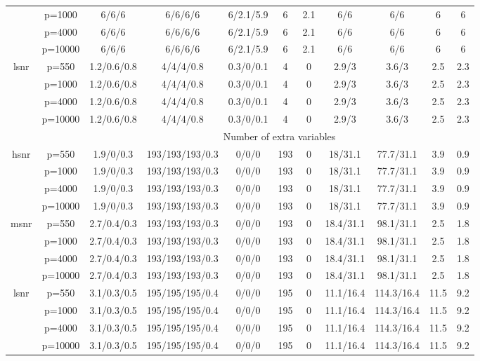 \begin{table}[ht]
{\begin{tabular}{|c|c|ccccccccc|}
   & p=1000 & 6/6/6 & 6/6/6/6 & 6/2.1/5.9 & 6 & 2.1 & 6/6 & 6/6 & 6 & 6 \\ 
   & p=4000 & 6/6/6 & 6/6/6/6 & 6/2.1/5.9 & 6 & 2.1 & 6/6 & 6/6 & 6 & 6 \\ 
   & p=10000 & 6/6/6 & 6/6/6/6 & 6/2.1/5.9 & 6 & 2.1 & 6/6 & 6/6 & 6 & 6 \\ 
  \midrule\multirow{4}[2]{*}{lsnr} & p=550 & 1.2/0.6/0.8 & 4/4/4/0.8 & 0.3/0/0.1 & 4 & 0 & 2.9/3 & 3.6/3 & 2.5 & 2.3 \\ 
   & p=1000 & 1.2/0.6/0.8 & 4/4/4/0.8 & 0.3/0/0.1 & 4 & 0 & 2.9/3 & 3.6/3 & 2.5 & 2.3 \\ 
   & p=4000 & 1.2/0.6/0.8 & 4/4/4/0.8 & 0.3/0/0.1 & 4 & 0 & 2.9/3 & 3.6/3 & 2.5 & 2.3 \\ 
   & p=10000 & 1.2/0.6/0.8 & 4/4/4/0.8 & 0.3/0/0.1 & 4 & 0 & 2.9/3 & 3.6/3 & 2.5 & 2.3 \\ 
   \midrule 
 \multicolumn{1}{|c}{} &       & \multicolumn{9}{c|}{Number of extra variables} \\
\midrule\multirow{4}[2]{*}{hsnr} & p=550 & 1.9/0/0.3 & 193/193/193/0.3 & 0/0/0 & 193 & 0 & 18/31.1 & 77.7/31.1 & 3.9 & 0.9 \\ 
   & p=1000 & 1.9/0/0.3 & 193/193/193/0.3 & 0/0/0 & 193 & 0 & 18/31.1 & 77.7/31.1 & 3.9 & 0.9 \\ 
   & p=4000 & 1.9/0/0.3 & 193/193/193/0.3 & 0/0/0 & 193 & 0 & 18/31.1 & 77.7/31.1 & 3.9 & 0.9 \\ 
   & p=10000 & 1.9/0/0.3 & 193/193/193/0.3 & 0/0/0 & 193 & 0 & 18/31.1 & 77.7/31.1 & 3.9 & 0.9 \\ 
  \midrule\multirow{4}[2]{*}{msnr} & p=550 & 2.7/0.4/0.3 & 193/193/193/0.3 & 0/0/0 & 193 & 0 & 18.4/31.1 & 98.1/31.1 & 2.5 & 1.8 \\ 
   & p=1000 & 2.7/0.4/0.3 & 193/193/193/0.3 & 0/0/0 & 193 & 0 & 18.4/31.1 & 98.1/31.1 & 2.5 & 1.8 \\ 
   & p=4000 & 2.7/0.4/0.3 & 193/193/193/0.3 & 0/0/0 & 193 & 0 & 18.4/31.1 & 98.1/31.1 & 2.5 & 1.8 \\ 
   & p=10000 & 2.7/0.4/0.3 & 193/193/193/0.3 & 0/0/0 & 193 & 0 & 18.4/31.1 & 98.1/31.1 & 2.5 & 1.8 \\ 
  \midrule\multirow{4}[2]{*}{lsnr} & p=550 & 3.1/0.3/0.5 & 195/195/195/0.4 & 0/0/0 & 195 & 0 & 11.1/16.4 & 114.3/16.4 & 11.5 & 9.2 \\ 
   & p=1000 & 3.1/0.3/0.5 & 195/195/195/0.4 & 0/0/0 & 195 & 0 & 11.1/16.4 & 114.3/16.4 & 11.5 & 9.2 \\ 
   & p=4000 & 3.1/0.3/0.5 & 195/195/195/0.4 & 0/0/0 & 195 & 0 & 11.1/16.4 & 114.3/16.4 & 11.5 & 9.2 \\ 
   & p=10000 & 3.1/0.3/0.5 & 195/195/195/0.4 & 0/0/0 & 195 & 0 & 11.1/16.4 & 114.3/16.4 & 11.5 & 9.2 \\ 
   \bottomrule 
\end{tabular}
}
\end{table}
